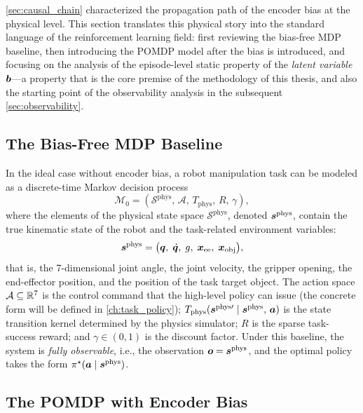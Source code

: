 \cref{sec:causal_chain} characterized the propagation path of the encoder bias at the physical level. This section translates this physical story into the standard language of the reinforcement learning field: first reviewing the bias-free MDP baseline, then introducing the POMDP model after the bias is introduced, and focusing on the analysis of the episode-level static property of the \emph{latent variable $\bm{b}$}---a property that is the core premise of the methodology of this thesis, and also the starting point of the observability analysis in the subsequent \cref{sec:observability}.

\subsection{The Bias-Free MDP Baseline}\label{subsec:mdp_baseline}

In the ideal case without encoder bias, a robot manipulation task can be modeled as a discrete-time Markov decision process~\cite{sutton2018reinforcement}
\begin{equation}
  \mathcal{M}_0 = (\mathcal{S}^{\text{phys}},\,\mathcal{A},\,T_{\text{phys}},\,R,\,\gamma),
  \label{eq:mdp0}
\end{equation}
where the elements of the physical state space $\mathcal{S}^{\text{phys}}$, denoted $\bm{s}^{\text{phys}}$, contain the true kinematic state of the robot and the task-related environment variables:
\begin{equation}
  \bm{s}^{\text{phys}} = \big(\bm{q},\;\dot{\bm{q}},\;g,\;\bm{x}_{\text{ee}},\;\bm{x}_{\text{obj}}\big),
  \label{eq:state_mdp}
\end{equation}
that is, the 7-dimensional joint angle, the joint velocity, the gripper opening, the end-effector position, and the position of the task target object. The action space $\mathcal{A} \subseteq \mathbb{R}^7$ is the control command that the high-level policy can issue (the concrete form will be defined in \cref{ch:task_policy}); $T_{\text{phys}}(\bm{s}^{\text{phys}\prime} \mid \bm{s}^{\text{phys}},\,\bm{a})$ is the state transition kernel determined by the physics simulator; $R$ is the sparse task-success reward; and $\gamma \in (0,1)$ is the discount factor. Under this baseline, the system is \emph{fully observable}, i.e., the observation $\bm{o} = \bm{s}^{\text{phys}}$, and the optimal policy takes the form $\pi^\star(\bm{a} \mid \bm{s}^{\text{phys}})$.

\subsection{The POMDP with Encoder Bias}\label{subsec:pomdp_def}

